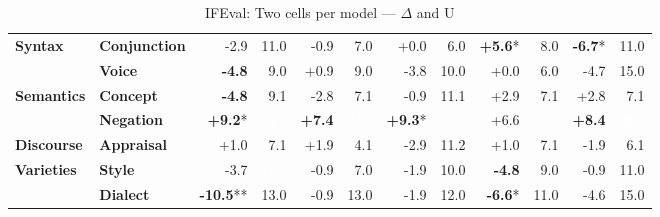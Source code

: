 \begin{table}[h]
{\begin{tabular}{llrrrrrrrrrr}
\midrule
\textbf{Syntax} & \textbf{Conjunction} & \cellcolor{red!5} -2.9 & \cellcolor{blue!28} 11.0 & \cellcolor{red!1} -0.9 & \cellcolor{blue!18} 7.0 & \cellcolor{red!0} +0.0 & \cellcolor{blue!15} 6.0 & \cellcolor{green!11} \textbf{+5.6}* & \cellcolor{blue!21} 8.0 & \cellcolor{red!13} \textbf{-6.7}* & \cellcolor{blue!28} 11.0 \\
  & \textbf{Voice} & \cellcolor{red!9} \textbf{-4.8} & \cellcolor{blue!23} 9.0 & \cellcolor{green!1} +0.9 & \cellcolor{blue!23} 9.0 & \cellcolor{red!7} -3.8 & \cellcolor{blue!26} 10.0 & \cellcolor{red!0} +0.0 & \cellcolor{blue!15} 6.0 & \cellcolor{red!9} -4.7 & \cellcolor{blue!39} 15.0 \\
\midrule
\textbf{Semantics} & \textbf{Concept} & \cellcolor{red!9} \textbf{-4.8} & \cellcolor{blue!23} 9.1 & \cellcolor{red!5} -2.8 & \cellcolor{blue!18} 7.1 & \cellcolor{red!1} -0.9 & \cellcolor{blue!29} 11.1 & \cellcolor{green!5} +2.9 & \cellcolor{blue!18} 7.1 & \cellcolor{green!5} +2.8 & \cellcolor{blue!18} 7.1 \\
  & \textbf{Negation} & \cellcolor{green!18} \textbf{+9.2}* & \cellcolor{blue!62} \textcolor{white}{24.0} & \cellcolor{green!14} \textbf{+7.4} & \cellcolor{blue!57} \textcolor{white}{22.0} & \cellcolor{green!18} \textbf{+9.3}* & \cellcolor{blue!62} \textcolor{white}{24.0} & \cellcolor{green!13} +6.6 & \cellcolor{blue!59} \textcolor{white}{23.0} & \cellcolor{green!16} \textbf{+8.4} & \cellcolor{blue!59} \textcolor{white}{23.0} \\
\midrule
\textbf{Discourse} & \textbf{Appraisal} & \cellcolor{green!1} +1.0 & \cellcolor{blue!18} 7.1 & \cellcolor{green!3} +1.9 & \cellcolor{blue!11} 4.1 & \cellcolor{red!5} -2.9 & \cellcolor{blue!29} 11.2 & \cellcolor{green!1} +1.0 & \cellcolor{blue!18} 7.1 & \cellcolor{red!3} -1.9 & \cellcolor{blue!16} 6.1 \\
\midrule
\textbf{Varieties} & \textbf{Style} & \cellcolor{red!7} -3.7 & \cellcolor{blue!46} \textcolor{white}{18.0} & \cellcolor{red!1} -0.9 & \cellcolor{blue!18} 7.0 & \cellcolor{red!3} -1.9 & \cellcolor{blue!26} 10.0 & \cellcolor{red!9} \textbf{-4.8} & \cellcolor{blue!23} 9.0 & \cellcolor{red!1} -0.9 & \cellcolor{blue!28} 11.0 \\
  & \textbf{Dialect} & \cellcolor{red!20} \textbf{-10.5}** & \cellcolor{blue!34} 13.0 & \cellcolor{red!1} -0.9 & \cellcolor{blue!34} 13.0 & \cellcolor{red!3} -1.9 & \cellcolor{blue!31} 12.0 & \cellcolor{red!13} \textbf{-6.6}* & \cellcolor{blue!28} 11.0 & \cellcolor{red!9} -4.6 & \cellcolor{blue!39} 15.0 \\
\bottomrule
\end{tabular}}
\caption{IFEval: Two cells per model — $\Delta$ and U}\label{tab:ifeval_combined_cells}
\end{table}